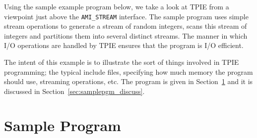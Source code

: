 Using the sample example program below, we take a look at TPIE from a
viewpoint just above the \verb|AMI_STREAM| interface.  The
sample program uses simple stream operations to generate a stream of random
integers, scans this stream of integers and partitions them into several
distinct streams. The manner in which I/O operations are handled by TPIE
ensures that the program is I/O efficient.


The intent of this example is to illustrate the sort of
things involved in TPIE programming; the typical include
files, specifying how much memory the program should use,
streaming operations, etc. The program is given in
Section~\ref{sec:samplepgm} and it is discussed in
Section~\ref{sec:samplepgm_discuss}.


\section{Sample Program}\label{sec:samplepgm}


